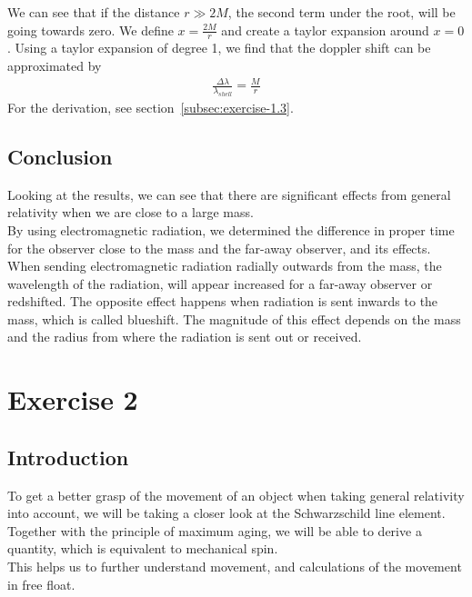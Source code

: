 \documentclass[reprint,english,notitlepage]{revtex4-2}
\begin{document}
        We can see that if the distance $r \gg 2M$, the second term under the root, will be going towards zero.
        We define $x = \frac{2M}{r}$ and create a taylor expansion around $x = 0$.
        Using a taylor expansion of degree 1, we find that the doppler shift can be approximated by
        \begin{align}
            \frac{\Delta \lambda}{\lambda_{shell}} = \frac{M}{r}
        \end{align}
        For the derivation, see section~\ref{subsec:exercise-1.3}.
        


    \subsection{Conclusion}\label{subsec:conclusion1}
        Looking at the results, we can see that there are significant effects from general relativity when we are close to a large mass.\\
        By using electromagnetic radiation, we determined the difference in proper time for the observer close to the mass and the far-away observer, and its effects.\\

        When sending electromagnetic radiation radially outwards from the mass, the wavelength of the radiation, will appear increased for a far-away observer or redshifted.
        The opposite effect happens when radiation is sent inwards to the mass, which is called blueshift.
        The magnitude of this effect depends on the mass and the radius from where the radiation is sent out or received.




\section{Exercise 2}\label{sec:exercise-2}
    \subsection{Introduction}\label{subsec:introduction2}
        To get a better grasp of the movement of an object when taking general relativity into account, we will be taking a closer look at the Schwarzschild line element.
        Together with the principle of maximum aging, we will be able to derive a quantity, which is equivalent to mechanical spin.\\
        This helps us to further understand movement, and calculations of the movement in free float.
\end{document}
